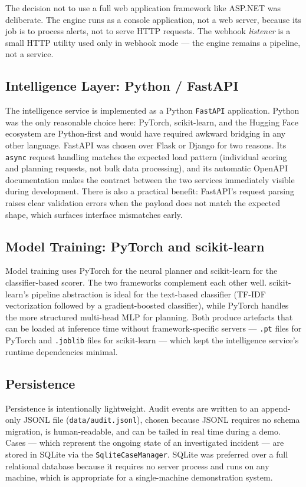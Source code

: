 The decision not to use a full web application framework like ASP.NET was deliberate. The engine runs as a console application, not a web server, because its job is to process alerts, not to serve HTTP requests. The webhook \emph{listener} is a small HTTP utility used only in webhook mode --- the engine remains a pipeline, not a service.

\subsection{Intelligence Layer: Python / FastAPI}

The intelligence service is implemented as a Python \texttt{FastAPI} application. Python was the only reasonable choice here: PyTorch, scikit-learn, and the Hugging Face ecosystem are Python-first and would have required awkward bridging in any other language. FastAPI was chosen over Flask or Django for two reasons. Its \texttt{async} request handling matches the expected load pattern (individual scoring and planning requests, not bulk data processing), and its automatic OpenAPI documentation makes the contract between the two services immediately visible during development. There is also a practical benefit: FastAPI's request parsing raises clear validation errors when the payload does not match the expected shape, which surfaces interface mismatches early.

\subsection{Model Training: PyTorch and scikit-learn}

Model training uses PyTorch for the neural planner and scikit-learn for the classifier-based scorer. The two frameworks complement each other well. scikit-learn's pipeline abstraction is ideal for the text-based classifier (TF-IDF vectorization followed by a gradient-boosted classifier), while PyTorch handles the more structured multi-head MLP for planning. Both produce artefacts that can be loaded at inference time without framework-specific servers --- \texttt{.pt} files for PyTorch and \texttt{.joblib} files for scikit-learn --- which kept the intelligence service's runtime dependencies minimal.

\subsection{Persistence}

Persistence is intentionally lightweight. Audit events are written to an append-only JSONL file (\texttt{data/audit.jsonl}), chosen because JSONL requires no schema migration, is human-readable, and can be tailed in real time during a demo. Cases --- which represent the ongoing state of an investigated incident --- are stored in SQLite via the \texttt{SqliteCaseManager}. SQLite was preferred over a full relational database because it requires no server process and runs on any machine, which is appropriate for a single-machine demonstration system.

